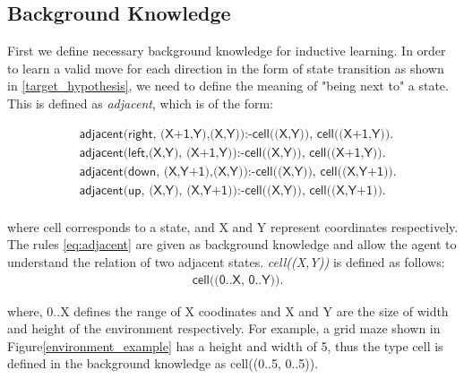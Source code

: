 \subsection{Background Knowledge}
\label{subsec:background_knowledge}
First we define necessary background knowledge for inductive learning.
In order to learn a valid move for each direction in the form of state transition as shown in \ref{target_hypothesis}, we need to define the meaning of "being next to" a state.
This is defined as \textit{adjacent}, which is of the form:

\begin{equation} \label{eq:adjacent}
\begin{split}
&\textsf{adjacent(right, (X+1,Y),(X,Y)):-cell((X,Y)), cell((X+1,Y)).} \\
&\textsf{adjacent(left,(X,Y),  (X+1,Y)):-cell((X,Y)), cell((X+1,Y)).} \\
&\textsf{adjacent(down, (X,Y+1),(X,Y)):-cell((X,Y)), cell((X,Y+1)).} \\
&\textsf{adjacent(up,   (X,Y),  (X,Y+1)):-cell((X,Y)), cell((X,Y+1)).} \\
\end{split}
\end{equation}

where \textsf{cell} corresponds to a state, and \textsf{X} and \textsf{Y} represent coordinates respectively.
The rules \ref{eq:adjacent} are given as background knowledge and allow the agent to understand the relation of two adjacent states.
\textit{cell((X,Y))} is defined as follows:
\begin{equation} \label{eq:cell}
\begin{split}
    &\textsf{cell((0..X, 0..Y)).}
\end{split}
\end{equation}

where, 0..X defines the range of X coodinates and X and Y are the size of width and height of the environment respectively. 
For example, a grid maze shown in Figure\ref{environment_example} has a height and width of 5, thus the type cell is defined in the background knowledge as \textsf{cell((0..5, 0..5))}.



